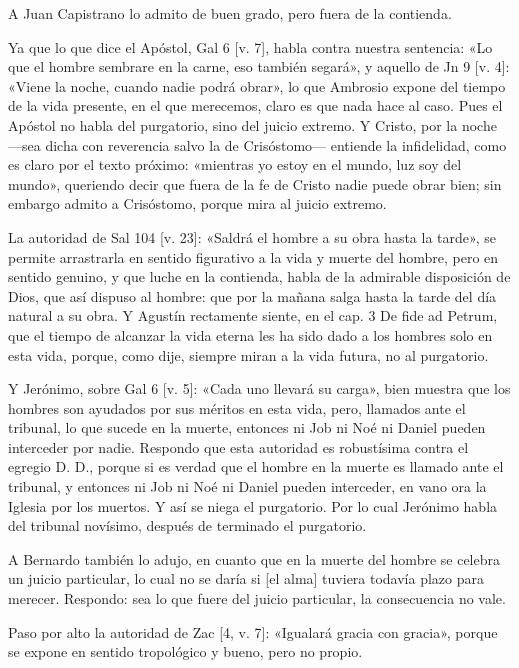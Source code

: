 A Juan Capistrano lo admito de buen grado, pero fuera de la contienda.

Ya que lo que dice el Apóstol, Gal 6 [v. 7], habla contra nuestra sentencia: «Lo que el hombre sembrare en la carne, eso también segará», y aquello de Jn 9 [v. 4]: «Viene la noche, cuando nadie podrá obrar», lo que Ambrosio expone del tiempo de la vida presente, en el que merecemos, claro es que nada hace al caso. Pues el Apóstol no habla del purgatorio, sino del juicio extremo. Y Cristo, por la noche —sea dicha con reverencia salvo la de Crisóstomo— entiende la infidelidad, como es claro por el texto próximo: «mientras yo estoy en el mundo, luz soy del mundo», queriendo decir que fuera de la fe de Cristo nadie puede obrar bien; sin embargo admito a Crisóstomo, porque mira al juicio extremo.

La autoridad de Sal 104 [v. 23]: «Saldrá el hombre a su obra hasta la tarde», se permite arrastrarla en sentido figurativo a la vida y muerte del hombre, pero en sentido genuino, y que luche en la contienda, habla de la admirable disposición de Dios, \marginpar{\small[332]} que así dispuso al hombre: que por la mañana salga hasta la tarde del día natural a su obra. Y Agustín rectamente siente, en el cap. 3 De fide ad Petrum, que el tiempo de alcanzar la vida eterna les ha sido dado a los hombres solo en esta vida, porque, como dije, siempre miran a la vida futura, no al purgatorio.

Y Jerónimo, sobre Gal 6 [v. 5]: «Cada uno llevará su carga», bien muestra que los hombres son ayudados por sus méritos en esta vida, pero, llamados ante el tribunal, lo que sucede en la muerte, entonces ni Job ni Noé ni Daniel pueden interceder por nadie. Respondo que esta autoridad es robustísima contra el egregio D. D., porque si es verdad que el hombre en la muerte es llamado ante el tribunal, y entonces ni Job ni Noé ni Daniel pueden interceder, en vano ora la Iglesia por los muertos. Y así se niega el purgatorio. Por lo cual Jerónimo habla del tribunal novísimo, después de terminado el purgatorio.

A Bernardo también lo adujo, en cuanto que en la muerte del hombre se celebra un juicio particular, lo cual no se daría si [el alma] tuviera todavía plazo para merecer. Respondo: sea lo que fuere del juicio particular, la consecuencia no vale.

Paso por alto la autoridad de Zac [4, v. 7]: «Igualará gracia con gracia», porque se expone en sentido tropológico y bueno, pero no propio.

